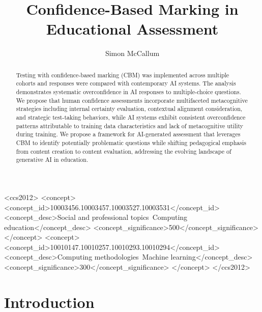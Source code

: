 \documentclass[sigconf]{acmart}
\begin{document}
\title{Confidence-Based Marking in Educational Assessment}

\author{Simon McCallum}

\begin{abstract}
  Testing with confidence-based marking (CBM) was implemented across multiple cohorts and responses were compared with contemporary AI systems. The analysis demonstrates systematic overconfidence in AI responses to multiple-choice questions. We propose that human confidence assessments incorporate multifaceted metacognitive strategies including internal certainty evaluation, contextual alignment consideration, and strategic test-taking behaviors, while AI systems exhibit consistent overconfidence patterns attributable to training data characteristics and lack of metacognitive utility during training. We propose a framework for AI-generated assessment that leverages CBM to identify potentially problematic questions while shifting pedagogical emphasis from content creation to content evaluation, addressing the evolving landscape of generative AI in education.
\end{abstract}

\begin{CCSXML}
<ccs2012>
<concept>
<concept_id>10003456.10003457.10003527.10003531</concept_id>
<concept_desc>Social and professional topics~Computing education</concept_desc>
<concept_significance>500</concept_significance>
</concept>
<concept>
<concept_id>10010147.10010257.10010293.10010294</concept_id>
<concept_desc>Computing methodologies~Machine learning</concept_desc>
<concept_significance>300</concept_significance>
</concept>
</ccs2012>
\end{CCSXML}



\maketitle

\section{Introduction}
\end{document}
